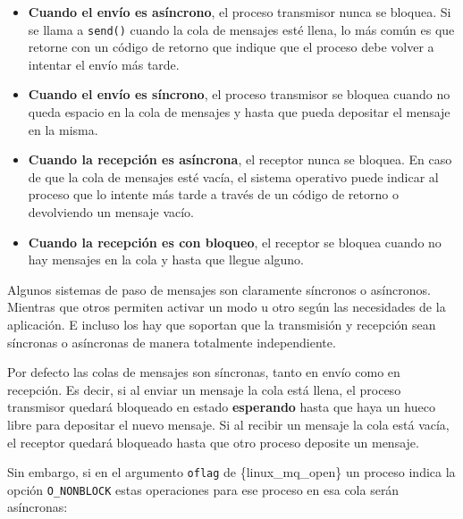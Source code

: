 \begin{itemize}
\item
  \textbf{Cuando el envío es asíncrono}, el proceso transmisor nunca se
  bloquea. Si se llama a \texttt{send()} cuando la cola de mensajes esté
  llena, lo más común es que retorne con un código de retorno que
  indique que el proceso debe volver a intentar el envío más tarde.
\item
  \textbf{Cuando el envío es síncrono}, el proceso transmisor se bloquea
  cuando no queda espacio en la cola de mensajes y hasta que pueda
  depositar el mensaje en la misma.
\item
  \textbf{Cuando la recepción es asíncrona}, el receptor nunca se
  bloquea. En caso de que la cola de mensajes esté vacía, el sistema
  operativo puede indicar al proceso que lo intente más tarde a través
  de un código de retorno o devolviendo un mensaje vacío.
\item
  \textbf{Cuando la recepción es con bloqueo}, el receptor se bloquea
  cuando no hay mensajes en la cola y hasta que llegue alguno.
\end{itemize}

Algunos sistemas de paso de mensajes son claramente síncronos o
asíncronos. Mientras que otros permiten activar un modo u otro según las
necesidades de la aplicación. E incluso los hay que soportan que la
transmisión y recepción sean síncronas o asíncronas de manera totalmente
independiente.

Por defecto las colas de mensajes son síncronas, tanto en envío como en
recepción. Es decir, si al enviar un mensaje la cola está llena, el
proceso transmisor quedará bloqueado en estado \textbf{esperando} hasta
que haya un hueco libre para depositar el nuevo mensaje. Si al recibir
un mensaje la cola está vacía, el receptor quedará bloqueado hasta que
otro proceso deposite un mensaje.

Sin embargo, si en el argumento \texttt{oflag} de \{linux\_mq\_open\} un
proceso indica la opción \texttt{O\_NONBLOCK} estas operaciones para ese
proceso en esa cola serán asíncronas:

\begin{Shaded}
\begin{Highlighting}[]
\OperatorTok{=}\OperatorTok{(}
    \OperatorTok{,}
\OperatorTok{|}\OperatorTok{,} 
    \OperatorTok{,}
    \OperatorTok{\&}
\OperatorTok{);}
\end{Highlighting}
\end{Shaded}

